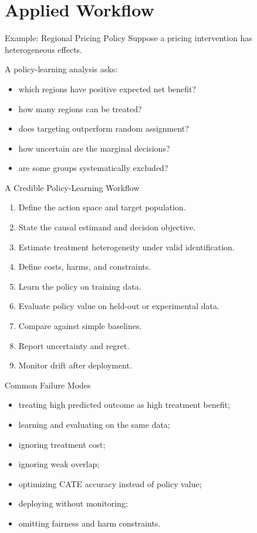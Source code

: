 \documentclass[aspectratio=169,11pt]{beamer}
\begin{document}
\section{Applied Workflow}

\begin{frame}{Example: Regional Pricing Policy}
Suppose a pricing intervention has heterogeneous effects.

A policy-learning analysis asks:
\begin{itemize}
\item which regions have positive expected net benefit?
\item how many regions can be treated?
\item does targeting outperform random assignment?
\item how uncertain are the marginal decisions?
\item are some groups systematically excluded?
\end{itemize}
\end{frame}

\begin{frame}{A Credible Policy-Learning Workflow}
\begin{enumerate}
\item Define the action space and target population.
\item State the causal estimand and decision objective.
\item Estimate treatment heterogeneity under valid identification.
\item Define costs, harms, and constraints.
\item Learn the policy on training data.
\item Evaluate policy value on held-out or experimental data.
\item Compare against simple baselines.
\item Report uncertainty and regret.
\item Monitor drift after deployment.
\end{enumerate}
\end{frame}

\begin{frame}{Common Failure Modes}
\begin{itemize}
\item treating high predicted outcome as high treatment benefit;
\item learning and evaluating on the same data;
\item ignoring treatment cost;
\item ignoring weak overlap;
\item optimizing CATE accuracy instead of policy value;
\item deploying without monitoring;
\item omitting fairness and harm constraints.
\end{itemize}
\end{frame}
\end{document}
